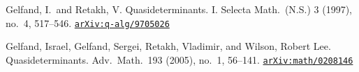 \documentclass[12pt,twoside]{article}
\newcommand\arxivref[1]{\href{http://arxiv.org/abs/#1}{\tt arXiv:#1}}
\theoremstyle{plain} %
\theoremstyle{definition} %
\theoremstyle{definition} %
\numberwithin{theorem}{section}
\numberwithin{equation}{section}
\numberwithin{figure}{section}
\numberwithin{table}{section}
\begin{document}
\begin{thebibliography}{99}



%
%

Gelfand, I.\ and Retakh, V. 
Quasideterminants. I. 
Selecta Math.\ (N.S.) 3 (1997), no.~4, 517--546.
\arxivref{q-alg/9705026}

Gelfand, Israel, Gelfand, Sergei, Retakh, Vladimir, and Wilson, Robert Lee. Quasideterminants. 
Adv.\ Math.\ 193 (2005), no.~1, 56--141.
\arxivref{math/0208146}

%
%
%
%


\end{thebibliography}
\end{document}
